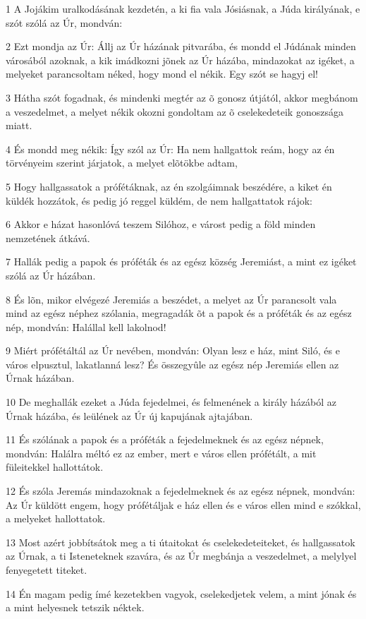 \par 1 A Jojákim uralkodásának kezdetén, a ki fia vala Jósiásnak, a Júda királyának, e szót szólá az Úr, mondván:
\par 2 Ezt mondja az Úr: Állj az Úr házának pitvarába, és mondd el Júdának minden városából azoknak, a kik imádkozni jõnek az Úr házába, mindazokat az igéket, a melyeket parancsoltam néked, hogy mond el nékik. Egy szót se hagyj  el!
\par 3 Hátha szót fogadnak, és mindenki megtér az õ gonosz útjától, akkor megbánom a veszedelmet, a melyet nékik okozni gondoltam az õ cselekedeteik gonoszsága miatt.
\par 4 És mondd meg nékik: Így szól az Úr: Ha nem hallgattok reám, hogy az én törvényeim szerint járjatok, a melyet elõtökbe adtam,
\par 5 Hogy hallgassatok a prófétáknak, az én szolgáimnak beszédére, a kiket én küldék hozzátok, és pedig jó reggel küldém, de nem hallgattatok rájok:
\par 6 Akkor e házat hasonlóvá teszem Silóhoz, e várost pedig a föld minden nemzetének átkává.
\par 7 Hallák pedig a papok és próféták és az egész község Jeremiást, a mint ez igéket szólá az Úr házában.
\par 8 És lõn, mikor elvégezé Jeremiás a beszédet, a melyet az Úr parancsolt vala mind az egész néphez szólania, megragadák õt a papok és a próféták és az egész nép, mondván: Halállal kell lakolnod!
\par 9 Miért prófétáltál az Úr nevében, mondván: Olyan lesz e ház, mint Siló, és e város elpusztul, lakatlanná lesz? És összegyûle az egész nép Jeremiás ellen az Úrnak házában.
\par 10 De meghallák ezeket a Júda fejedelmei, és felmenének a király házából az Úrnak házába, és leülének az Úr új kapujának ajtajában.
\par 11 És szólának a papok és a próféták a fejedelmeknek és az egész népnek, mondván: Halálra méltó ez az ember, mert e város ellen prófétált, a mit füleitekkel hallottátok.
\par 12 És szóla Jeremás mindazoknak a fejedelmeknek és az egész népnek, mondván: Az Úr küldött engem, hogy prófétáljak e ház ellen és e város ellen mind e szókkal, a melyeket hallottatok.
\par 13 Most azért jobbítsátok meg a ti útaitokat és cselekedeteiteket, és hallgassatok az Úrnak, a ti Isteneteknek szavára, és az Úr megbánja a veszedelmet, a melylyel fenyegetett titeket.
\par 14 Én magam pedig ímé kezetekben vagyok, cselekedjetek velem, a mint jónak és a mint helyesnek tetszik néktek.
